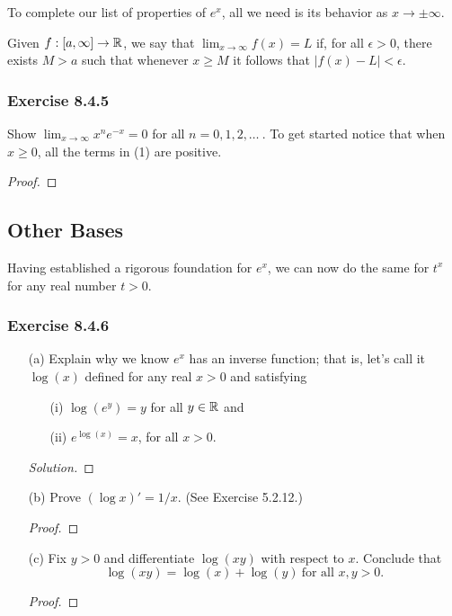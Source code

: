 To complete our list of properties of \( e^{x}  \), all we need is its behavior as \( x \to \pm \infty  \).

\begin{definition}{}{}
    Given \( f : [a,\infty ]  \to \mathbb{R} \), we say that \( \lim_{ x \to \infty  }  f(x) = L  \) if, for all \( \epsilon > 0  \), there exists \( M > a  \) such that whenever \( x \geq M  \) it follows that \( |  f(x) - L  | < \epsilon  \).
\end{definition}

\subsubsection{Exercise 8.4.5} Show \( \lim_{ x \to \infty  }  x^{n} e^{-x} = 0  \) for all \( n = 0,1,2, \dots \ \). To get started notice that when \( x \geq 0   \), all the terms in (1) are positive.
\begin{proof}

\end{proof}

\subsection{Other Bases}

Having established a rigorous foundation for \( e^{x}  \), we can now do the same for \( t^{x}  \) for any real number \( t > 0   \). 

\subsubsection{Exercise 8.4.6} 
\begin{enumerate}
    \item[(a)] Explain why we know \( e^{x}  \) has an inverse function; that is, let's call it \( \log(x)  \) defined for any real \(  x > 0  \) and satisfying
        \begin{enumerate}
            \item[(i)] \( \log(e^{y}) = y  \) for all \(  y\in \mathbb{R}  \) and 
            \item[(ii)] \( e^{\log(x)} = x  \), for all \( x > 0  \).
        \end{enumerate}
        \begin{proof}[Solution]
    
    \end{proof}
    \item[(b)] Prove \( (\log x )' = 1 / x   \). (See Exercise 5.2.12.)
        \begin{proof}
        
        \end{proof}
    \item[(c)] Fix \( y > 0  \) and differentiate \( \log(xy)  \) with respect to \( x  \). Conclude that 
        \[  \log(xy) = \log(x) + \log(y) \ \text{for all } x,y > 0. \]
        \begin{proof}
        
        \end{proof}
\end{enumerate}





